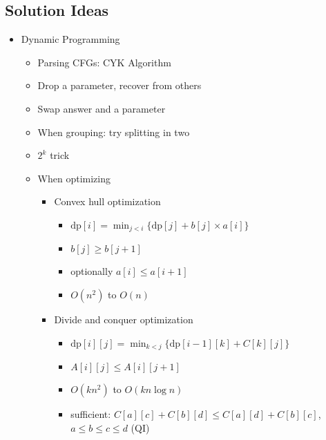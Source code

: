 \documentclass[8pt,a4paper,landscape,oneside]{amsart}
\newenvironment{myitemize}
{ \begin{itemize}[leftmargin=.5cm]
    \setlength{\itemsep}{0pt}
    \setlength{\parskip}{0pt}
    \setlength{\parsep}{0pt}     }
{ \end{itemize}                  }
\begin{document}
\begin{multicols*}{3}
        \subsection{Solution Ideas}
            \begin{myitemize}
                \item Dynamic Programming
                    \begin{itemize}
                        \item Parsing CFGs: CYK Algorithm
                        \item Drop a parameter, recover from others
                        \item Swap answer and a parameter
                        \item When grouping: try splitting in two
                        \item $2^k$ trick
                        \item When optimizing
                            \begin{itemize}
                                \item Convex hull optimization
                                    \begin{itemize}
                                        \item $\mathrm{dp}[i] = \min_{j<i}\{\mathrm{dp}[j] + b[j] \times a[i]\}$
                                        \item $b[j] \geq b[j+1]$
                                        \item optionally $a[i] \leq a[i+1]$
                                        \item $O(n^2)$ to $O(n)$
                                    \end{itemize}
                                \item Divide and conquer optimization
                                    \begin{itemize}
                                        \item $\mathrm{dp}[i][j] = \min_{k<j}\{\mathrm{dp}[i-1][k] + C[k][j]\}$
                                        \item $A[i][j] \leq A[i][j+1]$
                                        \item $O(kn^2)$ to $O(kn\log{n})$
                                        \item sufficient: $C[a][c] + C[b][d] \leq C[a][d] + C[b][c]$, $a\leq b\leq c\leq d$ (QI)
                                    \end{itemize}

\end{itemize}
\end{itemize}
\end{myitemize}
\end{multicols*}
\end{document}
